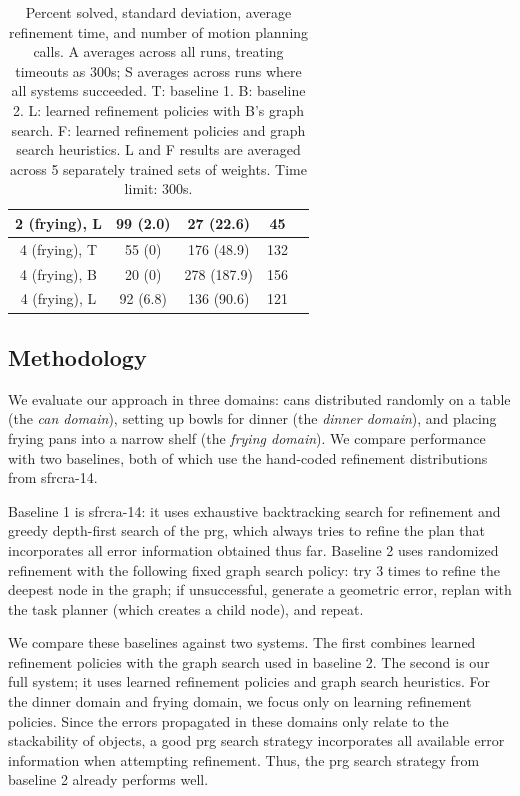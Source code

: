\begin{table}[t]
{\begin{tabular}{ccccc}
    \midrule
      2 (frying), L & 99 (2.0) & 27 (22.6) & 45\\
    \midrule[1.5pt]
      4 (frying), T & 55 (0) & 176 (48.9) & 132\\
    \midrule
      4 (frying), B & 20 (0) & 278 (187.9) & 156\\
    \midrule
      4 (frying), L & 92 (6.8) & 136 (90.6) & 121\\
    \bottomrule[1.5pt]
  \end{tabular}}
  \caption{\small{Percent solved, standard deviation, average refinement time, and number of motion
      planning calls. A averages across all runs, treating timeouts as 300s; S averages across runs where all systems succeeded.
      T: baseline 1. B: baseline 2.
      L: learned refinement policies with B's graph search.
      F: learned refinement policies and graph
      search heuristics. L and F results are averaged across 5
      separately trained sets of weights. Time limit: 300s.}}
  \label{table:results}
\end{table}

\subsection{Methodology}
We evaluate our approach in three domains: cans distributed randomly
on a table (the \emph{can domain}), setting up bowls for dinner (the
\emph{dinner domain}), and placing frying pans into a narrow shelf
(the \emph{frying domain}).  We compare performance with two
baselines, both of which use the hand-coded refinement distributions
from {\sc sfrcra-14}.

Baseline 1 is {\sc sfrcra-14}: it uses exhaustive backtracking search
for refinement and greedy depth-first search of the {\sc prg}, which
always tries to refine the plan that incorporates all error
information obtained thus far.  Baseline 2 uses randomized refinement
with the following fixed graph search policy: try 3 times to refine
the deepest node in the graph; if unsuccessful, generate a geometric
error, replan with the task planner (which creates a child node), and
repeat.

We compare these baselines against two systems. The first combines
learned refinement policies with the graph search used in baseline
2. The second is our full system; it uses learned refinement policies
and graph search heuristics.  For the dinner domain and frying domain,
we focus only on learning refinement policies. Since the errors propagated in these
domains only relate to the stackability of objects, a good {\sc prg} search strategy
incorporates all available error information when
attempting refinement. Thus, the {\sc prg} search strategy from baseline 2
already performs well.

